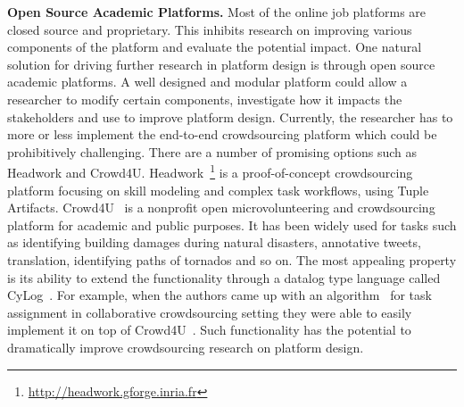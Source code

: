 \textbf{Open Source Academic Platforms.}
Most of the online job platforms are closed source and proprietary. 
This inhibits research on improving various components of the platform and evaluate the potential impact.
One natural solution for driving further research in platform design is through open source academic platforms.
A well designed and modular platform could allow a researcher to modify certain components, investigate how it impacts the stakeholders 
and use to improve platform design.
Currently, the researcher has to more or less implement the end-to-end crowdsourcing platform which could be prohibitively challenging.
There are a number of promising options such as Headwork and Crowd4U. Headwork~\footnote{\url{http://headwork.gforge.inria.fr}} is a proof-of-concept crowdsourcing platform focusing on skill modeling and complex task workflows, using Tuple Artifacts. Crowd4U~\cite{morishima2014crowd4u} is a nonprofit open microvolunteering and crowdsourcing platform for academic and public purposes.
It has been widely used for tasks such as identifying building damages during natural disasters, annotative tweets, translation,
identifying paths of tornados and so on. 
The most appealing property is its ability to extend the functionality through a datalog type language called CyLog~\cite{morishima2012cylog}.
For example, when the authors came up with an algorithm~\cite{rahman2015task} for task assignment in collaborative crowdsourcing setting
they were able to easily implement it on top of Crowd4U~\cite{ikeda2016collaborative}.
Such functionality has the potential to dramatically improve crowdsourcing research on platform design. 

